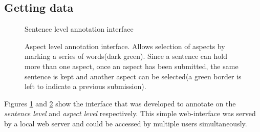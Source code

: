 \documentclass[a4paper,11pt]{kth-mag}
\begin{document}
\subsection{Getting data}
\begin{figure}[h]
  \centering
  \caption{Sentence level annotation interface}
  \label{fig:annotate_sentence}
\end{figure}

\begin{figure}[h]
  \centering
  \caption{Aspect level annotation interface. Allows selection of aspects by marking a series of words(dark green). Since a sentence can hold more than one aspect, once an aspect has been submitted, the same sentence is kept and another aspect can be selected(a green border is left to indicate a previous submission).}
  \label{fig:annotate_aspect}
\end{figure}

Figures \ref{fig:annotate_sentence} and \ref{fig:annotate_aspect} show the interface that was developed to annotate on the \emph{sentence level} and \emph{aspect level} respectively. This simple web-interface was served by a local web server and could be accessed by multiple users simultaneously.
\end{document}
